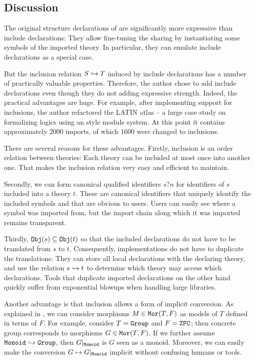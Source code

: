 \subsection{Discussion}

The original structure declarations of \mmt are significantly more expressive than include declarations: They allow fine-tuning the sharing by instantiating some symbols of the imported theory.
In particular, they can emulate include declarations as a special case.

But the inclusion relation $S\hookrightarrow T$ induced by include declarations has a number of practically valuable properties.
Therefore, the author chose to add include declarations even though they do not adding expressive strength.
Indeed, the practical advantages are huge.
For example, after implementing support for inclusions, the author refactored the LATIN atlas \cite{CHKMR:latinabs:11} -- a large case study on formalizing logics using an \mmt style module system.
At this point it contains approximately $2000$ imports, of which $1600$ were changed to inclusions.
\medskip

There are several reasons for these advantages.
Firstly, inclusion is an order relation between theories: Each theory can be included at most once into another one.
That makes the inclusion relation very easy and efficient to maintain.

Secondly, we can form canonical qualified identifiers $s?n$ for identifiers of $s$ included into a theory $t$.
These are canonical identifiers that uniquely identify the included symbols and that are obvious to users.
Users can easily see where a symbol was imported from, but the import chain along which it was imported remains transparent.

Thirdly, $\mathtt{Obj}(s)\subseteq\mathtt{Obj}(t)$ so that the included declarations do not have to be translated from $s$ to $t$.
Consequently, implementations do not have to duplicate the translations: They can store all local declarations with the declaring theory, and use the relation $s\hookrightarrow t$ to determine which theory may access which declarations.
Tools that duplicate imported declarations on the other hand quickly suffer from exponential blowups when handling large libraries.

Another advantage is that inclusion allows a form of implicit conversion.
As explained in \cite{RK:mmt:10}, we can consider morphisms $M\in\mathtt{Mor}(T,F)$ as models of $T$ defined in terms of $F$.
For example, consider $T=\operatorname{\mathtt{Group}}$ and $F=\operatorname{\mathtt{ZFC}}$; then concrete group corresponds to morphisms $G\in\mathtt{Mor}(T,F)$.
If we further assume $\operatorname{\mathtt{Monoid}}\hookrightarrow \operatorname{\mathtt{Group}}$, then $G|_{\operatorname{\mathtt{Monoid}}}$ is $G$ seen as a monoid.
Moreover, we can easily make the conversion $G\mapsto G|_{\operatorname{\mathtt{Monoid}}}$ implicit without confusing humans or tools.
\medskip


